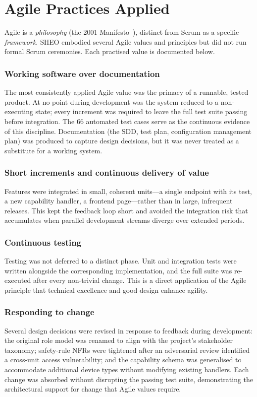 \section{Agile Practices Applied}
\label{sec:agile}

Agile is a \textit{philosophy} (the 2001 Manifesto~\cite{agile}), distinct from Scrum as a specific
\textit{framework}. SHEO embodied several Agile values and principles but did not run formal
Scrum ceremonies. Each practised value is documented below.

\subsubsection*{Working software over documentation}
The most consistently applied Agile value was the primacy of a runnable, tested product.
At no point during development was the system reduced to a non-executing state; every
increment was required to leave the full test suite passing before integration. The 66
automated test cases serve as the continuous evidence of this discipline. Documentation
(the SDD, test plan, configuration management plan) was produced to capture design
decisions, but it was never treated as a substitute for a working system.

\subsubsection*{Short increments and continuous delivery of value}
Features were integrated in small, coherent units---a single endpoint with its test, a new
capability handler, a frontend page---rather than in large, infrequent releases. This kept
the feedback loop short and avoided the integration risk that accumulates when parallel
development streams diverge over extended periods.

\subsubsection*{Continuous testing}
Testing was not deferred to a distinct phase. Unit and integration tests were written
alongside the corresponding implementation, and the full suite was re-executed after every
non-trivial change. This is a direct application of the Agile principle that technical
excellence and good design enhance agility.

\subsubsection*{Responding to change}
Several design decisions were revised in response to feedback during development: the
original role model was renamed to align with the project's stakeholder taxonomy;
safety-rule NFRs were tightened after an adversarial review identified a cross-unit
access vulnerability; and the capability schema was generalised to accommodate additional
device types without modifying existing handlers. Each change was absorbed without
disrupting the passing test suite, demonstrating the architectural support for change that
Agile values require.

